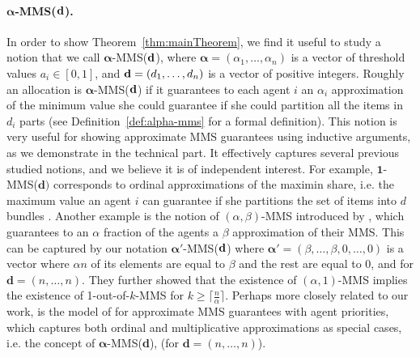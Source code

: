 
\paragraph{$\boldsymbol{\alpha}$-MMS(${\bf d}$).} In order to show Theorem~\ref{thm:mainTheorem}, we find it useful to study a notion that we call $\boldsymbol{\alpha}$-MMS(${\bf d}$), where $\boldsymbol{\alpha}=(\alpha_1,\ldots, \alpha_n)$ is a vector of threshold values $a_i\in [0,1]$, and  ${\bf d}=(d_1,\ldots, d_n)$ is a vector of positive integers. Roughly an allocation is $\boldsymbol{\alpha}$-MMS(${\bf d}$) if it guarantees to each agent $i$ an $\alpha_i$ approximation of the minimum value she could guarantee if she could partition all the items in $d_i$ parts  (see Definition~\ref{def:alpha-mms} for a formal definition).  This notion is very useful for showing approximate MMS guarantees using inductive arguments, as we demonstrate in the technical part. It effectively captures several previous studied notions, and we believe it is of independent interest. 
For example, $\mathbf{1}$-MMS($\mathbf{d})$ corresponds to ordinal approximations of the maximin share, i.e. the maximum value an agent $i$ can guarantee if she partitions the set of items into $d$ bundles \cite{BudishMMS}. 
Another example is the notion of $(\alpha, \beta)$-MMS introduced by \cite{HosseiniS21}, which guarantees to an $\alpha$ fraction of the agents a $\beta$ approximation of their MMS. This can be captured by our notation $\boldsymbol{\alpha'}$-MMS(${\bf d}$)  where $\boldsymbol{\alpha'}=(\beta, \ldots, \beta, 0,\ldots, 0)$ is a vector where $\alpha n$ of its elements are equal to $\beta$ and the rest are equal to $0$, and for $\mathbf{d} = (n, \dots, n)$. They further showed that the existence of $(\alpha, 1)$-MMS implies the existence of 1-out-of-$k$-MMS for $k \ge \lceil \frac{n}{\alpha} \rceil$. %
Perhaps more closely related to our work, is the model of \cite{AkramiGST24} for approximate MMS guarantees with agent priorities, which captures both ordinal and multiplicative approximations as special cases, i.e. the concept of $\boldsymbol{\alpha}$-MMS({\bf d}), (for $\mathbf{d} = (n, \dots, n)$). 



